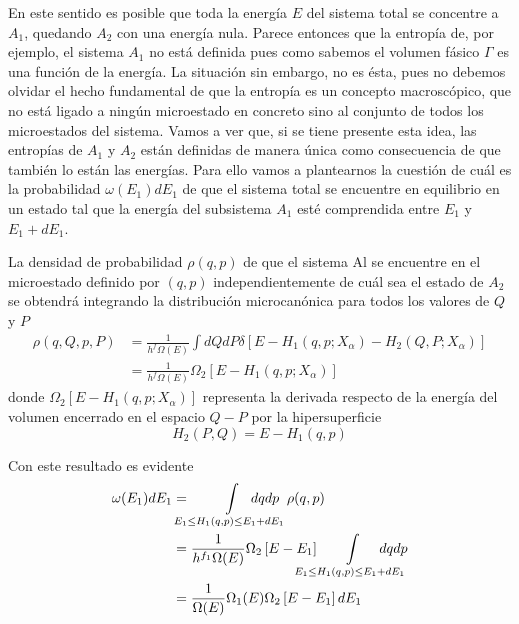 En este sentido es posible que toda la energía $E$ del sistema total se concentre a $A_1$, quedando $A_2$ con una energía nula. Parece entonces que la entropía de, por ejemplo, el sistema $A_1$ no está definida pues como sabemos el volumen fásico $\Gamma$ es una función de la energía.
La situación sin embargo, no es ésta, pues no debemos olvidar el hecho fundamental de que la entropía es un concepto macroscópico, que no está ligado a ningún microestado en concreto sino al conjunto de todos los microestados del sistema.
Vamos a ver que, si se tiene presente esta idea, las entropías de $A_1$ y $A_2$ están definidas de manera única como consecuencia de que también lo están las energías.
Para ello vamos a plantearnos la cuestión de cuál es la probabilidad $\omega(E_1) dE_1$ de que el sistema total se encuentre en equilibrio en un estado tal que la energía del subsistema $A_1$ esté comprendida entre $E_1$ y $E_1 + dE_1$.

La densidad de probabilidad $\rho(q, p)$ de que el sistema Al se encuentre en el microestado definido por $(q, p)$ independientemente de cuál sea el estado de $A_2$ se obtendrá integrando la distribución microcanónica para todos los valores de $Q$ y $P$
\begin{align}
	\rho(q,Q,p,P) &= \frac{1}{h^f \Omega(E)} \int dQ dP\delta \left[ E - H_1(q,p;X_\alpha) - H_2(Q,P;X_\alpha) \right]  \nonumber \\
			      &= \frac{1}{h^f \Omega(E)} \Omega_2 \left[ E - H_1(q,p;X_\alpha) \right]
\end{align}
donde $\Omega_2 \left[ E - H_1(q,p;X_\alpha) \right]$ representa la derivada respecto de la energía del volumen encerrado en el espacio $Q - P$ por la hipersuperficie
$$H_2 (P, Q) = E - H_1(q, p)$$

Con este resultado es evidente
\begin{align}
	\omega(E_1) dE_1 &= \mkern-18mu \int\limits_{E_1 \le H_1(q, p) \le E_1+dE_1} \mkern-50mu dq dp \mkern10mu \rho(q, p)  \nonumber\\
					 &= \frac{1}{h^{f_1} \Omega(E)} \Omega_2 \left[ E - E_1 \right] \mkern-28mu \int\limits_{E_1 \le H_1(q, p) \le E_1+dE_1} \mkern-40mu dq dp \\
					 &= \frac{1}{\Omega(E)} \Omega_1(E) \Omega_2 \left[ E - E_1 \right] dE_1  \nonumber
\end{align}


